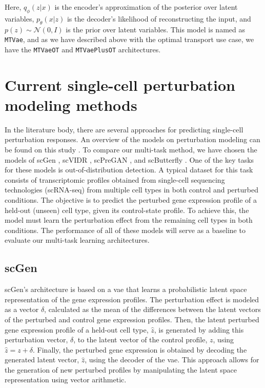 \documentclass[12pt, a4paper]{article}
\begin{document}
Here, $q_\phi(z|x)$ is the encoder's approximation of the posterior over latent variables, $p_\theta(x|z)$ is the decoder's likelihood of reconstructing the input, and $p(z) \sim \mathcal{N}(0, I)$ is the prior over latent variables. This model is named as \verb|MTVae|, and as we have described above with the optimal transport use case, we have the \verb|MTVaeOT| and \verb|MTVaePlusOT| architectures.



\section{Current single-cell perturbation modeling methods}

In the literature body, there are several approaches for predicting single-cell perturbation responses. An overview of the models on perturbation modeling can be found on this study \cite{gavriilidisMinireviewPerturbationModelling2024}. To compare our multi-task method, we have chosen the models of scGen \cite{lotfollahiScGenPredictsSinglecell2019}, scVIDR \cite{kanaGenerativeModelingSinglecell2023}, scPreGAN \cite{weiScPreGANDeepGenerative2022}, and scButterfly \cite{caoScButterflyVersatileSinglecell2024}.
One of the key tasks for these models is out-of-distribution detection. A typical dataset for this task consists of transcriptomic profiles obtained from single-cell sequencing technologies (scRNA-seq) from multiple cell types in both control and perturbed conditions. The objective is to predict the perturbed gene expression profile of a held-out (unseen) cell type, given its control-state profile. To achieve this, the model must learn the perturbation effect from the remaining cell types in both conditions. The performance of all of these models will serve as a baseline to evaluate our multi-task learning architectures.

\subsection{scGen}

scGen's architecture is based on a \gls{vae} that learns a probabilistic latent space representation of the gene expression profiles. 
The perturbation effect is modeled as a vector $\delta$, calculated as the mean of the differences between the latent vectors of the perturbed and control gene expression profiles. Then, the latent perturbed gene expression profile of a held-out cell type, $\hat{z}$,  is generated by adding this perturbation vector, $\delta$, to the latent vector of the control profile, $z$, using $\hat{z} = z + \delta$. Finally, the perturbed gene expression is obtained by decoding the generated latent vector, $\hat{z}$, using the decoder of the \gls{vae}. This approach allows for the generation of new perturbed profiles by manipulating the latent space representation using vector arithmetic.
\end{document}
